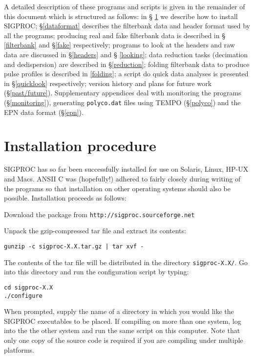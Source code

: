\documentclass[11pt]{article}
\begin{document}
A detailed description of these programs and scripts is given in the
remainder of this document which is structured as follows: in \S
\ref{install} we describe how to install SIGPROC; \S \ref{dataformat}
describes the filterbank data and header format used by all the
programs; producing real and fake filterbank data is described in \S
\ref{filterbank} and \S \ref{fake} respectively; programs to look at
the headers and raw data are discussed in \S \ref{headers} and \S
\ref{looking}; data reduction tasks (decimation and dedispersion) are
described in \S \ref{reduction}; folding filterbank data to produce
pulse profiles is described in \ref{folding}; a script do quick data
analyses is presented in \S \ref{quicklook} respectively; version
history and plans for future work (\S \ref{past/future}). 
Supplementary appendices deal with
monitoring the programs (\S \ref{monitoring}), 
generating {\tt polyco.dat} files using {\sc TEMPO}
(\S \ref{polyco}) and the EPN data format (\S \ref{epn}).

\section{Installation procedure}
\label{install}
SIGPROC has so far been successfully installed for use on Solaris,
Linux, HP-UX and Macs.
ANSII C was (hopefully!)  adhered to fairly closely
during writing of the programs so that installation on other operating
systems should also be possible.  Installation proceeds as follows:

Download the package from 
\verb+http://sigproc.sourceforge.net+

Unpack the gzip-compressed tar file and extract its contents:

\noindent 
{\tt gunzip -c sigproc-X.X.tar.gz | tar xvf -}

The contents of the tar file will be distributed in the directory
{\tt sigproc-X.X/}. Go into this directory and run the configuration
script by typing: 

\noindent
{\tt cd sigproc-X.X}\\
{\tt ./configure}

\noindent
When prompted, supply the name
of a directory in which you would like the SIGPROC executables to
be placed.
If compiling on more than one system, log into the the other system
and run the same script on this computer.
Note that only one copy of the source code is required
if you are compiling under multiple platforms.
\end{document}
